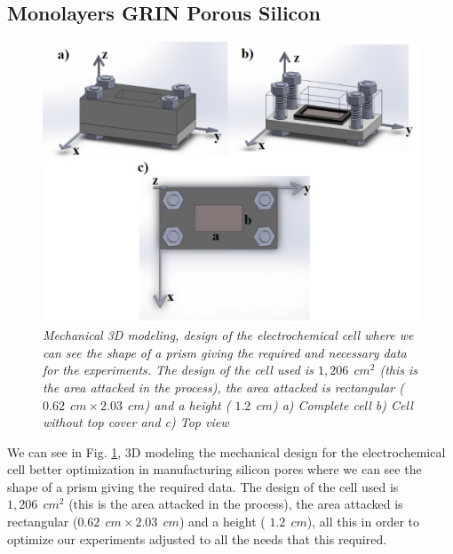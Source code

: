 \documentclass{article}
\begin{document}
\subsection{Monolayers GRIN Porous Silicon }
\begin{figure}
	\centering
	\includegraphics[scale=.3]{Images/celdan2}
	\caption{\emph{ Mechanical 3D modeling, design of the
            electrochemical cell where we can see the shape of a prism
            giving the required and necessary data for the
            experiments. The design of the cell used is $ 1,206 \ \ cm
            ^ 2 $ (this is the area attacked in the process), the area
            attacked is rectangular ($ 0.62 \ \ cm \times 2.03 \ \ cm
            $) and a height ( $ 1.2 \ \ cm $) a) Complete cell b) Cell
            without top cover and c) Top view}}
	\label{fig:por1}
\end{figure}
We can see in Fig. \ref{fig:por1}, 3D modeling the mechanical design
for the electrochemical cell  better optimization in manufacturing
silicon pores where we can see the shape of a prism giving the
required data. The design of the cell used is $ 1,206 \ \ cm ^ 2 $
(this is the area attacked in the process), the area attacked is
rectangular ($ 0.62 \ \ cm \times 2.03 \ \ cm $) and a height ( $ 1.2
\ \ cm $), all this in order to optimize our experiments adjusted to
all the needs that this required.
\end{document}
